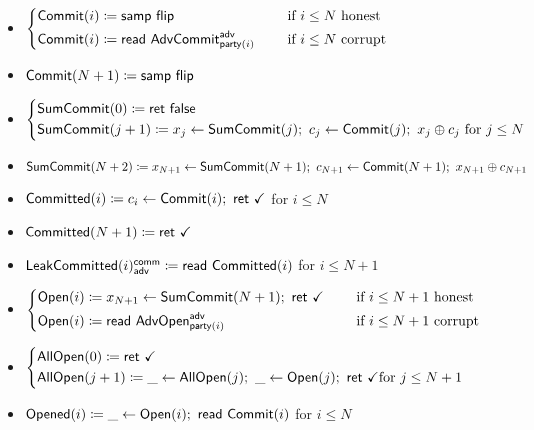 \begin{itemize}
\item {\color{blue} $\begin{cases*} \Commit(i) \coloneqq \samp{\flip} & \hspace{10pt} \text{if $i \leq N$ honest} \\ \Commit(i) \coloneqq \read{\AdvCommit^\adv_{\party(i)}} & \hspace{10pt} \text{if $i \leq N$ corrupt} \end{cases*}$}
\item {\color{blue} $\mathsf{Commit}(N+1) \coloneqq \mathsf{samp} \ \mathsf{flip}$}
\item {\color{blue} $\begin{cases*} \SumCommit(0) \coloneqq \ret{\false} \\ \SumCommit(j+1) \coloneqq x_j \leftarrow \SumCommit(j); \ c_j \leftarrow \Commit(j); \ x_j \oplus c_j \text{ for $j \leq N$} \end{cases*}$}
\item {\color{blue} $\SumCommit(N+2) \coloneqq x_{N+1} \leftarrow \SumCommit(N+1); \ c_{N+1} \leftarrow \Commit(N+1); \ x_{N+1} \oplus c_{N+1}$}
\item {\color{magenta} $\mathsf{Committed}(i) \coloneqq c_i \leftarrow \mathsf{Commit}(i); \ \mathsf{ret} \ \checkmark$ for $i \leq N$}
\item {\color{magenta} $\mathsf{Committed}(N+1) \coloneqq \mathsf{ret} \ \checkmark$}
\item {\color{magenta} $\mathsf{LeakCommitted}(i)^{\mathsf{comm}}_{\mathsf{adv}} \coloneqq \mathsf{read} \ \mathsf{Committed}(i)$ for $i \leq N+1$}
\item {\color{teal} $\begin{cases*} \Open(i) \coloneqq x_{N+1} \leftarrow \SumCommit(N+1); \ \ret{\checkmark} & \hspace{10pt} \text{if $i \leq N+1$ honest} \\ \Open(i) \coloneqq \read{\AdvOpen^\adv_{\party(i)}} & \hspace{10pt} \text{if $i \leq N+1$ corrupt} \end{cases*}$}
\item {\color{teal} $\begin{cases*} \AllOpen(0) \coloneqq \ret{\checkmark} \\ \AllOpen(j+1) \coloneqq \_ \leftarrow \AllOpen(j); \ \_ \leftarrow \Open(j); \ \ret{\checkmark} \text{for $j \leq N+1$} \end{cases*}$}
\item {\color{red} $\mathsf{Opened}(i) \coloneqq \_ \leftarrow \mathsf{Open}(i); \ \mathsf{read} \ \mathsf{Commit}(i)$ for $i \leq N$}

\end{itemize}

